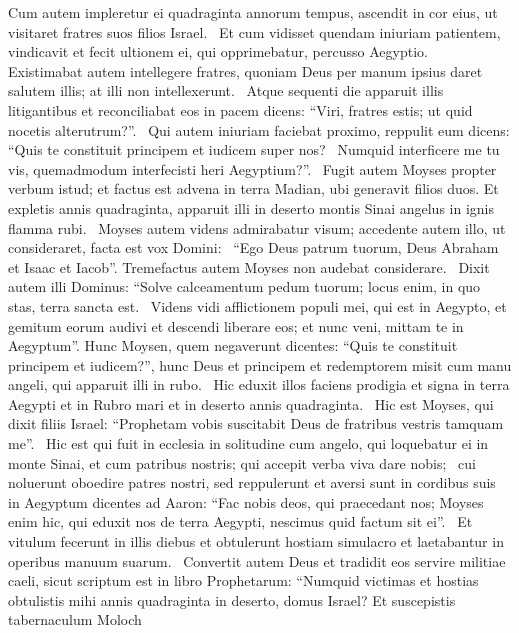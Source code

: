 \begin{biblechapter}
\begin{biblechapter}
\begin{biblechapter}
\begin{biblechapter}
\begin{biblechapter}
\begin{biblechapter}
\begin{biblechapter}
 \verse Cum autem impleretur ei quadraginta annorum tempus, ascendit in cor eius, ut visitaret fratres suos filios Israel. 
 \verse Et cum vidisset quendam iniuriam patientem, vindicavit et fecit ultionem ei, qui opprimebatur, percusso Aegyptio. 
 \verse Existimabat autem intellegere fratres, quoniam Deus per manum ipsius daret salutem illis; at illi non intellexerunt. 
 \verse Atque sequenti die apparuit illis litigantibus et reconciliabat eos in pacem dicens: “Viri, fratres estis; ut quid nocetis alterutrum?”. 
 \verse Qui autem iniuriam faciebat proximo, reppulit eum dicens: “Quis te constituit principem et iudicem super nos? 
 \verse Numquid interficere me tu vis, quemadmodum interfecisti heri Aegyptium?”. 
 \verse Fugit autem Moyses propter verbum istud; et factus est advena in terra Madian, ubi generavit filios duos.
 \verse Et expletis annis quadraginta, apparuit illi in deserto montis Sinai angelus in ignis flamma rubi. 
 \verse Moyses autem videns admirabatur visum; accedente autem illo, ut consideraret, facta est vox Domini: 
 \verse “Ego Deus patrum tuorum, Deus Abraham et Isaac et Iacob”. Tremefactus autem Moyses non audebat considerare. 
 \verse Dixit autem illi Dominus: “Solve calceamentum pedum tuorum; locus enim, in quo stas, terra sancta est. 
 \verse Videns vidi afflictionem populi mei, qui est in Aegypto, et gemitum eorum audivi et descendi liberare eos; et nunc veni, mittam te in Aegyptum”.
 \verse Hunc Moysen, quem negaverunt dicentes: “Quis te constituit principem et iudicem?”, hunc Deus et principem et redemptorem misit cum manu angeli, qui apparuit illi in rubo. 
 \verse Hic eduxit illos faciens prodigia et signa in terra Aegypti et in Rubro mari et in deserto annis quadraginta. 
 \verse Hic est Moyses, qui dixit filiis Israel: “Prophetam vobis suscitabit Deus de fratribus vestris tamquam me”. 
 \verse Hic est qui fuit in ecclesia in solitudine cum angelo, qui loquebatur ei in monte Sinai, et cum patribus nostris; qui accepit verba viva dare nobis; 
 \verse cui noluerunt oboedire patres nostri, sed reppulerunt et aversi sunt in cordibus suis in Aegyptum
\verse dicentes ad Aaron: “Fac nobis deos, qui praecedant nos; Moyses enim hic, qui eduxit nos de terra Aegypti, nescimus quid factum sit ei”. 
 \verse Et vitulum fecerunt in illis diebus et obtulerunt hostiam simulacro et laetabantur in operibus manuum suarum. 
 \verse Convertit autem Deus et tradidit eos servire militiae caeli, sicut scriptum est in libro Prophetarum:
 “Numquid victimas et hostias obtulistis mihi
 annis quadraginta in deserto, domus Israel?
 \verse Et suscepistis tabernaculum Moloch

\end{biblechapter}
\end{biblechapter}
\end{biblechapter}
\end{biblechapter}
\end{biblechapter}
\end{biblechapter}
\end{biblechapter}
